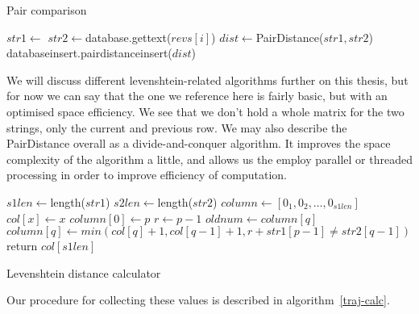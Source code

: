 \begin{algorithm}[p]
\caption{Pair comparison}\label{pair-comp}
  \begin{algorithmic}
    \State $str1 \gets $
    \State $str2 \gets $database.gettext($revs[i]$)
    \State $dist \gets $PairDistance($str1, str2$)
    \State databaseinsert.pairdistanceinsert($dist$)  
    \EndIf
    \EndFor
  \EndProcedure
  \end{algorithmic}
\end{algorithm}

We will discuss different levenshtein-related algorithms further on
this thesis, but for now we can say that the one we reference here is
fairly basic, but with an optimised space efficiency. We see that we
don't hold a whole matrix for the two strings, only the current and
previous row. We may also describe the PairDistance overall as a
divide-and-conquer algorithm. It improves the space complexity of the
algorithm a little, and allows us the employ parallel or threaded
processing in order to improve efficiency of computation.

\begin{algorithm}
  \begin{algorithmic}
    \State $s1len \gets $length($str1$)
    \State $s2len \gets $length($str2$)
    \State $column \gets [0_{1}, 0_{2}, \ldots, 0_{s1len}]$
    \State $col[x] \gets x$
    \EndFor
    \State $column[0] \gets p$
    \State $r \gets p-1$
    \State $oldnum \gets column[q]$
    \State $column[q] \gets min(col[q]+1, col[q-1] + 1, r + str1[p-1] \neq str2[q-1])$
    \EndFor
    \EndFor
    \State return $col[s1len]$
    \EndFunction
  \end{algorithmic}
  \caption{Levenshtein distance calculator}
  \label{lev-dist}
\end{algorithm}

Our procedure for collecting these values is described in
algorithm~\ref{traj-calc}.

